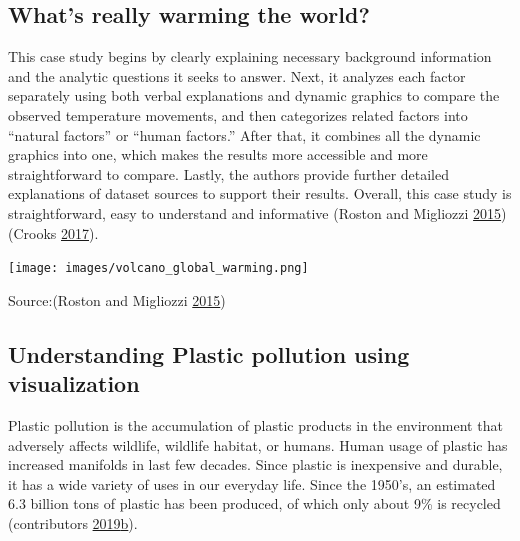 \documentclass[]{book}
\begin{document}
\hypertarget{whats-really-warming-the-world}{%
\subsection{What's really warming the world?}\label{whats-really-warming-the-world}}

This case study begins by clearly explaining necessary background information and the analytic questions it seeks to answer. Next, it analyzes each factor separately using both verbal explanations and dynamic graphics to compare the observed temperature movements, and then categorizes related factors into ``natural factors'' or ``human factors.'' After that, it combines all the dynamic graphics into one, which makes the results more accessible and more straightforward to compare. Lastly, the authors provide further detailed explanations of dataset sources to support their results. Overall, this case study is straightforward, easy to understand and informative (Roston and Migliozzi \protect\hyperlink{ref-world_warming}{2015}) (Crooks \protect\hyperlink{ref-int_viz_capt}{2017}).

\texttt{[image: images/volcano\_global\_warming.png]}

Source:(Roston and Migliozzi \protect\hyperlink{ref-world_warming}{2015})

\hypertarget{understanding-plastic-pollution-using-visualization}{%
\subsection{Understanding Plastic pollution using visualization}\label{understanding-plastic-pollution-using-visualization}}

Plastic pollution is the accumulation of plastic products in the environment that adversely affects wildlife, wildlife habitat, or humans. Human usage of plastic has increased manifolds in last few decades. Since plastic is inexpensive and durable, it has a wide variety of uses in our everyday life. Since the 1950's, an estimated 6.3 billion tons of plastic has been produced, of which only about 9\% is recycled (contributors \protect\hyperlink{ref-wiki_plastic_pollution}{2019}\protect\hyperlink{ref-wiki_plastic_pollution}{b}).
\end{document}
